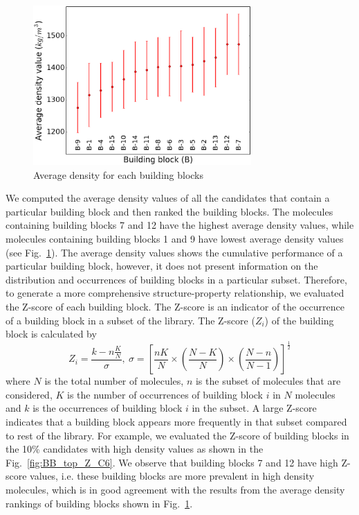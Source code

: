 \begin{figure}[htbp] 
	\centering
	\includegraphics[width=0.744\textwidth]{Chapter-6/Figures/BB_avg_den.eps}
	\caption{Average density for each building blocks}
	\label{fig:bb_avden} 
\end{figure} 

We computed the average density values of all the candidates that contain a particular building block and then ranked the building blocks. The molecules containing building blocks 7 and 12 have the highest average density values, while molecules containing building blocks 1 and 9 have lowest average density values (see Fig.\ \ref{fig:bb_avden}). The average density values shows the cumulative performance of a particular building block, however, it does not present information on the distribution and occurrences of building blocks in a particular subset. Therefore, to generate a more comprehensive structure-property relationship, we evaluated the Z-score of each building block. The Z-score is an indicator of the occurrence of a building block in a subset of the library. The Z-score ($Z_i$) of the building block is calculated by
\[
Z_i=\frac{k-n\frac{K}{N} }{\sigma},\ \sigma=\left [ \frac{nK}{N}\times \left ( \frac{N-K}{N} \right )\times \left ( \frac{N-n}{N-1} \right )\right ]^{\frac{1}{2}}
\]
where $N$ is the total number of molecules, $n$ is the subset of molecules that are considered, $K$ is the number of occurrences of building block $i$ in $N$ molecules and $k$ is the occurrences of building block $i$ in the subset. A large Z-score indicates that a building block appears more frequently in that subset compared to rest of the library. For example, we evaluated the Z-score of building blocks in the 10\% candidates with high density values as shown in the Fig.\ \ref{fig:BB_top_Z_C6}. We observe that building blocks 7 and 12 have high Z-score values, i.e. these building blocks are more prevalent in high density molecules, which is in good agreement with the results from the average density rankings of building blocks shown in Fig.\ \ref{fig:bb_avden}.  

